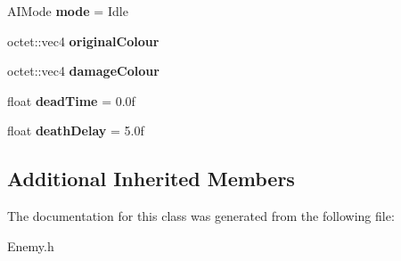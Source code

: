 \begin{DoxyCompactItemize}
\item 
\hypertarget{class_arena_1_1_enemy_aefdaa12f70d6a5e04ce116910a0eaf08}{A\+I\+Mode {\bfseries mode} = Idle}\label{class_arena_1_1_enemy_aefdaa12f70d6a5e04ce116910a0eaf08}

\item 
\hypertarget{class_arena_1_1_enemy_a9d24db112aaebbd116843ffdcbabb446}{octet\+::vec4 {\bfseries original\+Colour}}\label{class_arena_1_1_enemy_a9d24db112aaebbd116843ffdcbabb446}

\item 
\hypertarget{class_arena_1_1_enemy_a87ac19a8345ced47f23d540751b436ce}{octet\+::vec4 {\bfseries damage\+Colour}}\label{class_arena_1_1_enemy_a87ac19a8345ced47f23d540751b436ce}

\item 
\hypertarget{class_arena_1_1_enemy_a9679a4f0c4bab16a68f34ff93ed4671b}{float {\bfseries dead\+Time} = 0.\+0f}\label{class_arena_1_1_enemy_a9679a4f0c4bab16a68f34ff93ed4671b}

\item 
\hypertarget{class_arena_1_1_enemy_a36c89279f8a207f9289ad2d69125aa29}{float {\bfseries death\+Delay} = 5.\+0f}\label{class_arena_1_1_enemy_a36c89279f8a207f9289ad2d69125aa29}

\end{DoxyCompactItemize}
\subsection*{Additional Inherited Members}


The documentation for this class was generated from the following file\+:\begin{DoxyCompactItemize}
\item 
Enemy.\+h\end{DoxyCompactItemize}
